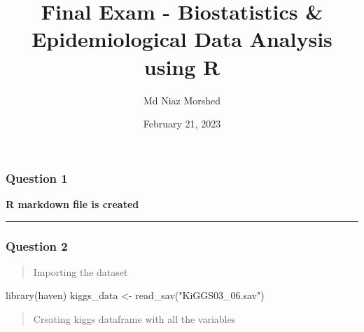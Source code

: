\documentclass[
]{article}
\title{Final Exam - Biostatistics \& Epidemiological Data Analysis using
R}
\author{Md Niaz Morshed}
\date{February 21, 2023}
\newenvironment{Shaded}{\begin{snugshade}}{\end{snugshade}}
\newcommand{\AttributeTok}[1]{\textcolor[rgb]{0.77,0.63,0.00}{#1}}
\newcommand{\FunctionTok}[1]{\textcolor[rgb]{0.00,0.00,0.00}{#1}}
\newcommand{\NormalTok}[1]{#1}
\newcommand{\OtherTok}[1]{\textcolor[rgb]{0.56,0.35,0.01}{#1}}
\newcommand{\SpecialCharTok}[1]{\textcolor[rgb]{0.00,0.00,0.00}{#1}}
\newcommand{\StringTok}[1]{\textcolor[rgb]{0.31,0.60,0.02}{#1}}
\begin{document}
\maketitle

\hypertarget{question-1}{%
\subsubsection{Question 1}\label{question-1}}

\textbf{R markdown file is created}

\begin{center}\rule{0.5\linewidth}{0.5pt}\end{center}

\hypertarget{question-2}{%
\subsubsection{Question 2}\label{question-2}}

\begin{quote}
Importing the dataset
\end{quote}

\begin{Shaded}
\begin{Highlighting}[]
\FunctionTok{library}\NormalTok{(haven)}
\NormalTok{kiggs\_data }\OtherTok{\textless{}{-}} \FunctionTok{read\_sav}\NormalTok{(}\StringTok{"KiGGS03\_06.sav"}\NormalTok{)}
\end{Highlighting}
\end{Shaded}

\begin{quote}
Creating kiggs dataframe with all the variables
\end{quote}

\begin{Shaded}
\end{Shaded}
\end{document}
